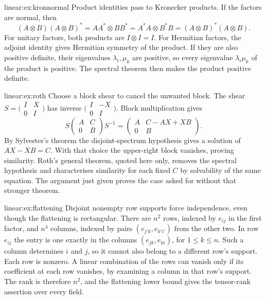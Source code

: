\begin{solution}{linear:ex:kronnormal}
\idea Product identities pass to Kronecker products.
\writeup If the factors are normal, then
\[
(A\otimes B)(A\otimes B)^*=AA^*\otimes BB^*
 =A^*A\otimes B^*B=(A\otimes B)^*(A\otimes B).
\]
For unitary factors, both products are $I\otimes I=I$. For Hermitian factors, the adjoint identity gives Hermitian symmetry of the product. If they are also positive definite, their eigenvalues $\lambda_i,\mu_k$ are positive, so every eigenvalue $\lambda_i\mu_k$ of the product is positive. The spectral theorem then makes the product positive definite.
\end{solution}

\begin{solution}{linear:ex:roth}
\idea Choose a block shear to cancel the unwanted block.
\writeup The shear $S=\bigl(\begin{smallmatrix}I&X\\0&I\end{smallmatrix}\bigr)$ has inverse $\bigl(\begin{smallmatrix}I&-X\\0&I\end{smallmatrix}\bigr)$. Block multiplication gives
\[
S\begin{pmatrix}A&C\\0&B\end{pmatrix}S^{-1}
 =\begin{pmatrix}A&C-AX+XB\\0&B\end{pmatrix}.
\]
By Sylvester's theorem the disjoint-spectrum hypothesis gives a solution of $AX-XB=C$. With that choice the upper-right block vanishes, proving similarity. Roth's general theorem, quoted here only, removes the spectral hypothesis and characterises similarity for each fixed $C$ by solvability of the same equation. The argument just given proves the case asked for without that stronger theorem.
\end{solution}

\begin{solution}{linear:ex:flattening}
\idea Disjoint nonempty row supports force independence, even though the flattening is rectangular.
\writeup There are $n^2$ rows, indexed by $e_{ij}$ in the first factor, and $n^4$ columns, indexed by pairs $(e_{j'k},e_{k'i'})$ from the other two. In row $e_{ij}$ the entry is one exactly in the columns $(e_{jk},e_{ki})$, for $1\le k\le n$. Such a column determines $i$ and $j$, so it cannot also belong to a different row's support. Each row is nonzero. A linear combination of the rows can vanish only if its coefficient at each row vanishes, by examining a column in that row's support. The rank is therefore $n^2$, and the flattening lower bound gives the tensor-rank assertion over every field.
\end{solution}

